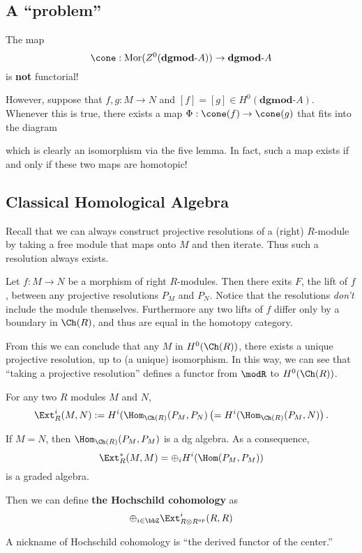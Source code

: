 \documentclass[12pt]{article}
\newcommand*{\dgmodA}{\mathbf{dgmod}\text{-}A}
\begin{document}
\subsection{A ``problem''}
The map
\[\cone:\operatorname{Mor}(Z^0(\dgmodA))\to \dgmodA\]
is \textbf{not} functorial! 

However, suppose that $f,g:M\to N$ and $[f]=[g]\in H^0(\dgmodA)$. Whenever this is true, there exists
a map $\Phi:\cone(f)\to \cone(g)$ that fits into the diagram
\begin{center}
\end{center}

\noindent which is clearly an isomorphism via the five lemma. In fact, such a map exists 
if and only if these two maps are homotopic!

\subsection{Classical Homological Algebra}
Recall that we can always construct projective resolutions of a (right) $R$-module by taking
a free module that maps onto $M$ and then iterate. Thus such a resolution always exists.

Let $f:M\to N$ be a morphism of right $R$-modules. Then there exits $F$, the lift of $f$,
between any projective resolutions $P_M$ and $P_N$. Notice that the resolutions \textit{don't}
include the module themselves. Furthermore any two lifts of $f$ differ only by a boundary in $\Ch(R)$,
and thus are equal in the homotopy category.

From this we can conclude that any $M$ in $H^0(\Ch(R))$, there exists a unique projective resolution,
up to (a unique) isomorphism. In this way, we can see that ``taking a projective resolution'' defines a 
functor from $\modR$ to $H^0(\Ch(R))$.

For any two $R$ modules $M$ and $N$, 
\[\Ext_R^i(M,N):=H^i(\Hom_{\Ch(R)}(P_M,P_N)\left(=H^i(\Hom_{\Ch(R)}(P_M,N)\right).\]

If $M=N$, then $\Hom_{\Ch(R)}(P_M,P_M)$ is a dg algebra. As a consequence,
\[\Ext_R^*(M,M)=\oplus_i H^i(\Hom(P_M,P_M))\]
is a graded algebra.

\begin{defn}
	Then we can define \textbf{the Hochschild cohomology} as
	\[\oplus_{i\in \bbZ}\Ext_{R\otimes R^{op}}^i(R,R)\]
\end{defn}
\begin{rmk}
	A nickname of Hochschild cohomology is ``the derived functor of the center.'' 
\end{rmk}
\end{document}

